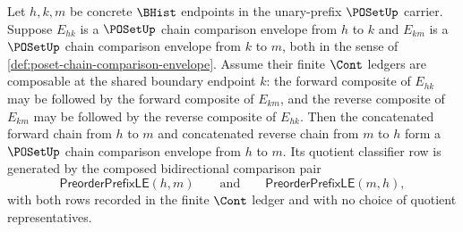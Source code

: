 \begin{theorem}
\label{thm:poset-chain-envelope-concatenation-closure}
Let $h,k,m$ be concrete $\BHist$ endpoints in the unary-prefix $\POSetUp$ carrier. Suppose $E_{hk}$ is a $\POSetUp$ chain comparison envelope from $h$ to $k$ and $E_{km}$ is a $\POSetUp$ chain comparison envelope from $k$ to $m$, both in the sense of \autoref{def:poset-chain-comparison-envelope}. Assume their finite $\Cont$ ledgers are composable at the shared boundary endpoint $k$: the forward composite of $E_{hk}$ may be followed by the forward composite of $E_{km}$, and the reverse composite of $E_{km}$ may be followed by the reverse composite of $E_{hk}$. Then the concatenated forward chain from $h$ to $m$ and concatenated reverse chain from $m$ to $h$ form a $\POSetUp$ chain comparison envelope from $h$ to $m$. Its quotient classifier row is generated by the composed bidirectional comparison pair
$$
\mathsf{PreorderPrefixLE}(h,m)
\qquad\text{and}\qquad
\mathsf{PreorderPrefixLE}(m,h),
$$
with both rows recorded in the finite $\Cont$ ledger and with no choice of quotient representatives.
\end{theorem}
